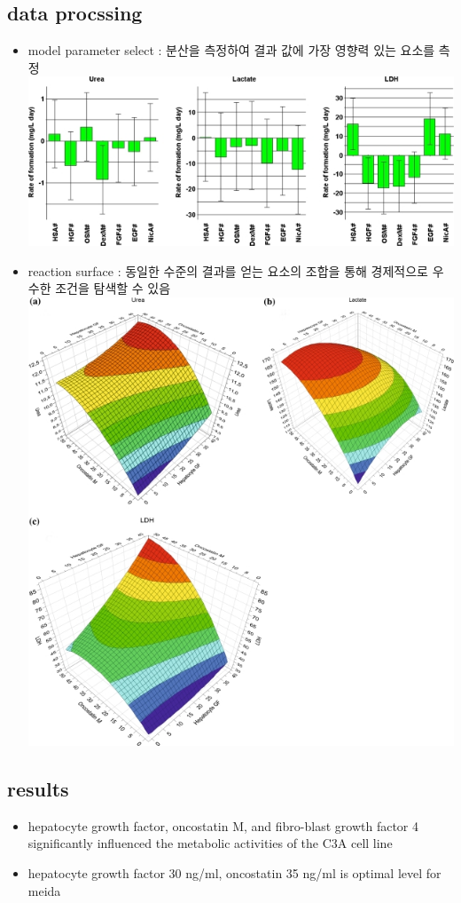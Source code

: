 \documentclass{article}
\begin{document}
\subsection{data procssing}
\begin{itemize}
    \item model parameter select : 분산을 측정하여 결과 값에 가장 영향력 있는 요소를 측정\\ \includegraphics[scale=0.5]{variance.jpg}
    \item reaction surface : 동일한 수준의 결과를 얻는 요소의 조합을 통해 경제적으로 우수한 조건을 탐색할 수 있음\\ \includegraphics[scale=0.3]{reactionsurfae.jpg}
\end{itemize}

\subsection{results}
\begin{itemize}
    \item hepatocyte growth factor, oncostatin M, and fibro-blast growth factor 4 significantly influenced the metabolic activities of the C3A cell line
    \item hepatocyte growth factor 30 ng/ml, oncostatin 35 ng/ml is optimal level for meida
\end{itemize}

    
\end{document}

